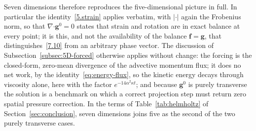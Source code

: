 \documentclass[11pt]{jfm}
\providecommand\bcdot{\boldsymbol{\cdot}}
\numberwithin{equation}{section}
\begin{document}
\noindent Seven dimensions therefore reproduces the five-dimensional picture in full. In particular
the identity~\eqref{5.strain} applies verbatim, with $\lvert\cdot\rvert$ again the Frobenius norm,
so that $\nabla\bcdot\boldsymbol{g}^0=0$ states that strain and rotation are in exact balance at
every point; it is this, and not the
availability of the balance $\boldsymbol{f}=\boldsymbol{g}$, that distinguishes~\eqref{7.10} from an
arbitrary phase vector. The discussion of Subsection~\ref{subsec:5D-forced} otherwise applies
without change: the forcing is the
closed-form, zero-mean divergence of the advective momentum flux; it does no net work, by the
identity~\eqref{eq:energy-flux}, so the kinetic energy decays through viscosity alone, here with
the factor $e^{-14\alpha^2\kappa t}$; and because $\boldsymbol{g}^0$ is purely transverse the
solution is a benchmark on which a correct projection step must return zero spatial pressure
correction. In the terms of Table~\ref{tab:helmholtz} of Section~\ref{sec:conclusion}, seven dimensions joins five as the second
of the two purely transverse cases.
\end{document}
